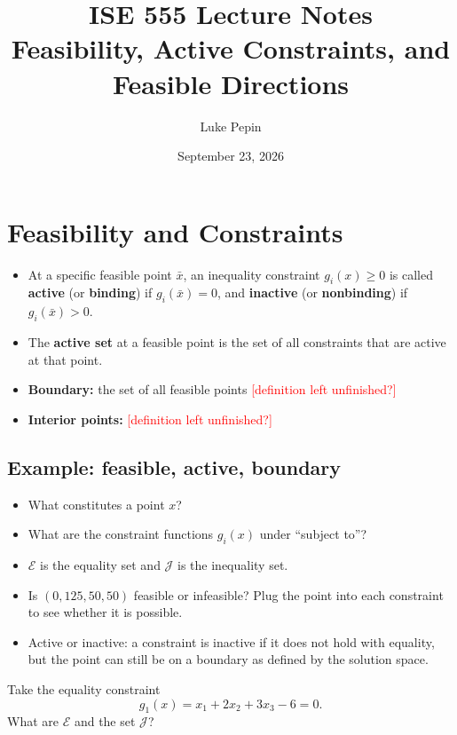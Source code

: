 \documentclass[11pt]{article}
\title{ISE 555 Lecture Notes\\\large Feasibility, Active Constraints, and Feasible Directions}
\author{Luke Pepin}
\date{September 23, 2026}
\newcommand{\unclear}[1]{\textcolor{red}{[#1?]}}
\begin{document}
\maketitle

\section{Feasibility and Constraints}

\begin{itemize}
    \item At a specific feasible point $\bar{x}$, an inequality constraint
          $g_i(x) \ge 0$ is called \textbf{active} (or \textbf{binding}) if
          $g_i(\bar{x}) = 0$, and \textbf{inactive} (or \textbf{nonbinding}) if
          $g_i(\bar{x}) > 0$.
    \item The \textbf{active set} at a feasible point is the set of all constraints
          that are active at that point.
    \item \textbf{Boundary:} the set of all feasible points \unclear{definition left unfinished}
    \item \textbf{Interior points:} \unclear{definition left unfinished}
\end{itemize}

\subsection*{Example: feasible, active, boundary}

\begin{itemize}
    \item What constitutes a point $x$?
    \item What are the constraint functions $g_i(x)$ under ``subject to''?
    \item $\mathcal{E}$ is the equality set and $\mathcal{J}$ is the inequality set.
    \item Is $(0, 125, 50, 50)$ feasible or infeasible? Plug the point into each
          constraint to see whether it is possible.
    \item Active or inactive: a constraint is inactive if it does not hold with
          equality, but the point can still be on a boundary as defined by the
          solution space.
\end{itemize}

Take the equality constraint
\[
    g_1(x) = x_1 + 2x_2 + 3x_3 - 6 = 0.
\]
What are $\mathcal{E}$ and the set $\mathcal{J}$?
\end{document}
